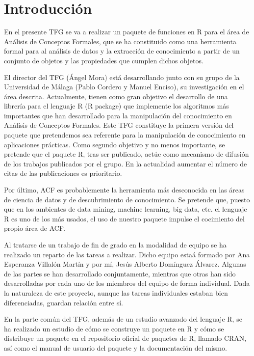 \section{Introducci\'on}

En el presente TFG se va a realizar un paquete de funciones en R para el \'area de An\'alisis de Conceptos Formales, que se ha constituido como una herramienta formal para al an\'alisis de datos y la extracci\'on de conocimiento a partir de un conjunto de objetos y las propiedades que cumplen dichos objetos.

El director del TFG (\'Angel Mora) est\'a desarrollando junto con su grupo de la Universidad de M\'alaga (Pablo Cordero y Manuel Enciso), su investigaci\'on en el \'area descrita. Actualmente, tienen como gran objetivo el desarrollo de una librer\'ia para el lenguaje R (R package) que implemente los algoritmos m\'as importantes que han desarrollado para la manipulaci\'on del conocimiento en  An\'alisis de Conceptos Formales. Este TFG constituye la primera versi\'on del paquete que pretendemos sea referente para la manipulaci\'on de conocimiento en aplicaciones pr\'acticas. Como segundo objetivo y no menos importante, se pretende que el paquete R, tras ser publicado, act\'ue como mecanismo de difusi\'on de los trabajos publicados por el grupo. En la actualidad aumentar el n\'umero de citas de las publicaciones es prioritario. 

Por \'ultimo, ACF es probablemente la herramienta m\'as desconocida en las \'areas de ciencia de datos y de descubrimiento de conocimiento. Se pretende que, puesto que en los ambientes de data mining, machine learning, big data, etc. el lenguaje R es uno de los m\'as usados, el uso de nuestro paquete impulse el cocimiento del propio \'area de ACF.

Al tratarse de un trabajo de fin de grado en la modalidad de equipo se ha realizado un reparto de las tareas a realizar. Dicho equipo esta\'a formado por Ana Esperanza Villal\'on Mart\'in y por m\'i, Jes\'us Alberto Dom\'inguez \'Alvarez. Algunas de las partes se han desarrollado conjuntamente, mientras que otras han sido desarrolladas por cada uno de los miembros del equipo de forma individual. Dada la naturaleza de este proyecto, aunque las tareas individuales estaban bien diferenciadas, guardan relaci\'on entre s\'i.

En la parte com\'un del TFG, adem\'as de un estudio avanzado del lenguaje R, se ha realizado un estudio de c\'omo se construye un paquete en R y c\'omo se distribuye un paquete en el repositorio oficial de paquetes de R, llamado CRAN, as\'i como el manual de usuario del paquete y la documentaci\'on del mismo.

